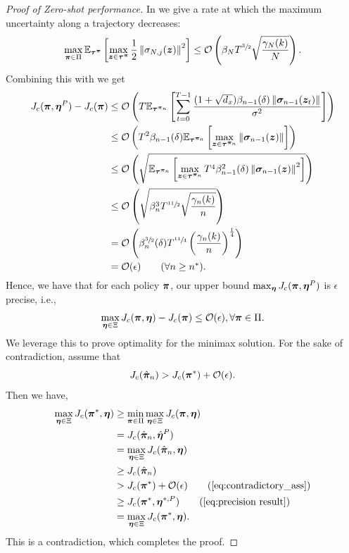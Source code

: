 \begin{proof}[Proof of Zero-shot performance]
In  we give a rate at which the maximum uncertainty along a trajectory decreases:
\begin{equation*}
     \max_{{\bm{\pi}} \in \Pi} \mathbb{E}_{{\bm{\tau}}^{{\bm{\pi}}}}\left[ \max_{ {\bm{z}} \in {\bm{\tau}}^{{\bm{\pi}}}} \frac{1}{2}\left\lVert\sigma_{N, j}({\bm{z}})\right\rVert^2 \right] \le {\mathcal{O}} \left(\beta_N T^{\sfrac{3}{2}}\sqrt{\frac{{\gamma}_{N}(k)}{N}}\right).
\end{equation*}
Combining this with  we get
\begin{align*}
    J_c({\bm{\pi}}, {\bm{\eta}}^{P}) - J_c({\bm{\pi}})  &\leq  {\mathcal{O}}\left(T \mathbb{E}_{{\bm{\tau}}^{{\bm{\pi}}_n}} \left[\sum^{T-1}_{t=0} \frac{(1 + \sqrt{d_x}) \beta_{n-1}(\delta) \left\lVert{\bm{\sigma}}_{n-1}({\bm{z}}_{ t})\right\rVert}{\sigma^2}\right]\right) \\
    &\le {\mathcal{O}}\left( T^2 \beta_{n-1}(\delta)\mathbb{E}_{{\bm{\tau}}^{{\bm{\pi}}_n}} \left[ \max_{ {\bm{z}} \in {\bm{\tau}}^{{\bm{\pi}}_n}}  \left\lVert{\bm{\sigma}}_{n-1}({\bm{z}})\right\rVert\right]\right) \\
    &\le {\mathcal{O}}\left(\sqrt{\mathbb{E}_{{\bm{\tau}}^{{\bm{\pi}}_n}} \left[ \max_{ {\bm{z}} \in {\bm{\tau}}^{{\bm{\pi}}_n}}  T^4 \beta^2_{n-1}(\delta)\left\lVert{\bm{\sigma}}_{n-1}({\bm{z}})\right\rVert^2\right]}\right) \\
    &\le {\mathcal{O}}\left(\sqrt{
    \beta^3_n T^{\sfrac{11}{2}}\sqrt{\frac{{\gamma}_{n}(k)}{n}}}\right) \\
    &= {\mathcal{O}}\left(
    \beta^{\sfrac{3}{2}}_n(\delta) T^{\sfrac{11}{4}}\left(\frac{{\gamma}_{n}(k)}{n}\right)^{\frac{1}{4}}\right) \\
    &= {\mathcal{O}}(\epsilon) \tag{$\forall n \geq n^*$}.
\end{align*}
Hence, we have that for each policy ${\bm{\pi}}$, our upper bound $\max_{{\bm{\eta}}} J_c({\bm{\pi}}, {\bm{\eta}}^{P})$ is $\epsilon$ precise, i.e.,
\begin{equation}
\label{eq:precision result}
    \max_{{\bm{\eta}} \in \Xi} J_c({\bm{\pi}}, {\bm{\eta}}) - J_c({\bm{\pi}})  \leq {\mathcal{O}}(\epsilon), \forall {\bm{\pi}} \in \Pi.
\end{equation}
We leverage this to prove optimality for the minimax solution. For the sake of contradiction, assume that 
\begin{equation}
\label{eq:contradictory_ass}
   J_c(\Hat{{\bm{\pi}}}_n) > J_c({\bm{\pi}}^*) + {\mathcal{O}}(\epsilon). 
\end{equation}
Then we have,
\begin{align*}
    \max_{\veta \in \Xi} J_c(\vpi^*, \veta) &\ge \min_{\vpi \in \Pi }\max_{\veta \in \Xi} J_c(\vpi, \veta) \\
    &= J_c(\Hat{\vpi}_n, \Hat{\veta}^P) \\
    &= \max_{\veta \in \Xi} J_c(\Hat{\vpi}_n, \veta) \\
    &\ge J_c(\Hat{\vpi}_n) \\
    &> J_c(\vpi^*) + \setO(\epsilon) \tag{\Cref{eq:contradictory_ass}}\\
    &\geq J_c(\vpi^*, \veta^{*, P}) \tag{\Cref{eq:precision result}}\\
    &= \max_{\veta \in \Xi} J_c(\vpi^*, \veta).
\end{align*}
This is a contradiction, which completes the proof.
\end{proof}
